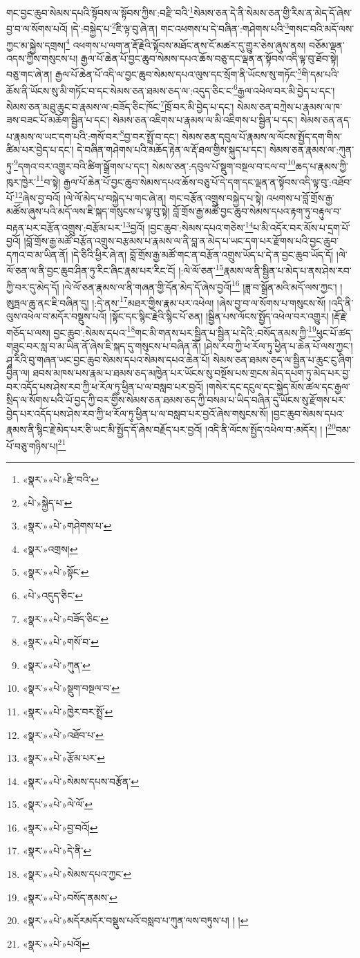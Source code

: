 གང་བྱང་ཆུབ་སེམས་དཔའི་སྟོབས་ལ་སྟོབས་ཀྱིས་:བརྫི་བའི་\footnote{«སྣར་»«པེ་»རྫི་བའི་}སེམས་ཅན་དེ་ནི་སེམས་ཅན་གྱི་རིས་ན་མེད་དོ་ཞེས་བྱ་བ་ལ་སོགས་པའོ། །དེ་:བསྐྱེད་པ་\footnote{«པེ་»སྐྱེད་པ་}ཇི་ལྟ་བུ་ཞེ་ན། གང་འཕགས་པ་དེ་བཞིན་:གཤེགས་པའི་\footnote{«སྣར་»«པེ་»གཤེགས་པ་}གསང་བའི་མདོ་ལས་ཀྱང་མ་སྐྱེས་དགྲས།\footnote{«སྣར་»འགྲས།} འཕགས་པ་ལག་ན་རྡོ་རྗེའི་སྟོབས་མཐོང་ནས་ངོ་མཚར་དུ་གྱུར་ཅེས་ཞུས་ནས། བཅོམ་ལྡན་འདས་ཀྱིས་གསུངས་པ། རྒྱལ་པོ་ཆེན་པོ་བྱང་ཆུབ་སེམས་དཔའ་ཆོས་བཅུ་དང་ལྡན་ན་སྟོབས་འདི་ལྟ་བུ་ཐོབ་སྟེ། བཅུ་གང་ཞེ་ན། རྒྱལ་པོ་ཆེན་པོ་འདི་ལ་བྱང་ཆུབ་སེམས་དཔའ་ལུས་དང་སྲོག་ནི་ཡོངས་སུ་གཏོང་\footnote{«སྣར་»«པེ་»སྟོང་}གི་དམ་པའི་ཆོས་ནི་ཡོངས་སུ་མི་གཏོང་བ་དང་སེམས་ཅན་ཐམས་ཅད་ལ་:འདུད་ཅིང་ང་\footnote{«པེ་»འདུད་ཅིང་}རྒྱལ་འཕེལ་བར་མི་བྱེད་པ་དང་། སེམས་ཅན་མཐུ་ཆུང་བ་རྣམས་ལ་:བཟོད་ཅིང་ཁོང་\footnote{«སྣར་»«པེ་»བཟོད་ཅིང་}ཁྲོ་བར་མི་བྱེད་པ་དང་། སེམས་ཅན་བཀྲེས་པ་རྣམས་ལ་ཁ་ཟས་བཟང་པོ་མཆོག་སྦྱིན་པ་དང་། སེམས་ཅན་འཇིགས་པ་རྣམས་ལ་མི་འཇིགས་པ་སྦྱིན་པ་དང་། སེམས་ཅན་ནད་པ་རྣམས་ལ་ཡང་དག་པའི་:གསོ་བར་\footnote{«སྣར་»«པེ་»གསོ་བ་}བྱ་བར་སྤྲོ་བ་དང་། སེམས་ཅན་དབུལ་པོ་རྣམས་ལ་ལོངས་སྤྱོད་དག་གིས་ཚིམ་པར་བྱེད་པ་དང་། དེ་བཞིན་གཤེགས་པའི་མཆོད་རྟེན་ལ་རྡོ་ཐལ་གྱིས་སྐུད་པ་དང་། སེམས་ཅན་རྣམས་ལ་:ཀུན་ཏུ་\footnote{«སྣར་»«པེ་»ཀུན་}དགའ་བར་འགྱུར་བའི་ཚིག་སྒྲོགས་པ་དང་། སེམས་ཅན་:དབུལ་པོ་སྡུག་བསྔལ་བ་ངལ་བ་\footnote{«སྣར་»«པེ་»སྡུག་བསྔལ་བ་}ཆད་པ་རྣམས་ཀྱི་ཁུར་ཁྱེར་\footnote{«སྣར་»«པེ་»ཁྱེར་བར་སྤྲོ་}བ་སྟེ། རྒྱལ་པོ་ཆེན་པོ་བྱང་ཆུབ་སེམས་དཔའ་ཆོས་བཅུ་པོ་དེ་དག་དང་ལྡན་ན་སྟོབས་འདི་ལྟ་བུ་:འཐོབ་པོ་\footnote{«སྣར་»«པེ་»འཐོབ་པ་}ཞེས་བྱ་བའོ། །ལེ་ལོ་མེད་པ་བསྐྱེད་པ་གང་ཞེ་ན། གང་བརྩོན་འགྲུས་བསྐྱེད་པ་སྟེ། འཕགས་པ་བློ་གྲོས་རྒྱ་མཚོས་ཞུས་པའི་མདོ་ལས་ཇི་སྐད་གསུངས་པ་ལྟ་བུ་སྟེ། བློ་གྲོས་རྒྱ་མཚོ་བྱང་ཆུབ་སེམས་དཔའ་རྟག་ཏུ་བརྟུལ་བ་བརྟན་པར་བརྩོན་འགྲུས་:བརྩོམ་པར་\footnote{«སྣར་»«པེ་»རྩོམ་པར་}བྱའོ། །བྱང་ཆུབ་:སེམས་དཔའ་གཅེས་\footnote{«སྣར་»«པེ་»སེམས་དཔས་བརྩོན་}པ་མི་འདོར་བར་མོས་པ་དྲག་པོ་བྱའོ། །བློ་གྲོས་རྒྱ་མཚོ་བརྩོན་འགྲུས་བརྩམས་པ་རྣམས་ལ་ནི་བླ་ན་མེད་པ་ཡང་དག་པར་རྫོགས་པའི་བྱང་ཆུབ་དཀའ་བ་མ་ཡིན་ནོ། །དེ་ཅིའི་ཕྱིར་ཞེ་ན། བློ་གྲོས་རྒྱ་མཚོ་གང་ན་བརྩོན་འགྲུས་ཡོད་པ་དེ་ན་བྱང་ཆུབ་ཡོད་དོ། །ལེ་ལོ་ཅན་ལ་ནི་བྱང་ཆུབ་ཤིན་ཏུ་རིང་ཞིང་རྣམ་པར་རིང་ངོ། །:ལེ་ལོ་ཅན་\footnote{«སྣར་»«པེ་»ལེ་ལོ་}རྣམས་ལ་ནི་སྦྱིན་པ་མེད་པ་ནས་ཤེས་རབ་ཀྱི་བར་དུ་མེད་དོ། །ལེ་ལོ་ཅན་རྣམས་ལ་ནི་གཞན་གྱི་དོན་མེད་དོ་ཞེས་བྱའོ།\footnote{«སྣར་»«པེ་»བྱ་བའོ།} །ཟླ་བ་སྒྲོན་མའི་མདོ་ལས་ཀྱང་། །ཨུཏྤལ་ཆུ་ནང་ཇི་བཞིན་དུ། །:དེ་ནས་\footnote{«སྣར་»«པེ་»དེ་ནི་}མཐར་གྱིས་རྣམ་པར་འཕེལ། །ཞེས་བྱ་བ་ལ་སོགས་པ་གསུངས་སོ། །འདི་ནི་ལུས་འཕེལ་བ་མདོར་བསྡུས་པའོ། །སྟོང་དང་སྙིང་རྗེའི་སྙིང་པོ་ཅན། །སྦྱིན་པས་ལོངས་སྤྱོད་འཕེལ་བར་འགྱུར། །རྡོ་རྗེ་གཅོད་པ་ལས། བྱང་ཆུབ་:སེམས་དཔའ་\footnote{«སྣར་»«པེ་»སེམས་དཔའ་ཀྱང་}གང་མི་གནས་པར་སྦྱིན་པ་སྦྱིན་པ་དེའི་:བསོད་ནམས་ཀྱི་\footnote{«སྣར་»«པེ་»བསོད་ནམས་}ཕུང་པོ་ཚད་གཟུང་བར་སླ་བ་མ་ཡིན་ནོ་ཞེས་ཇི་སྐད་དུ་གསུངས་པ་བཞིན་ནོ། །ཤེས་རབ་ཀྱི་ཕ་རོལ་ཏུ་ཕྱིན་པ་ཆེན་པོ་ལས་ཀྱང་། ཤཱ་རིའི་བུ་གཞན་ཡང་བྱང་ཆུབ་སེམས་དཔའ་སེམས་དཔའ་ཆེན་པོ། སེམས་ཅན་ཐམས་ཅད་ལ་སྦྱིན་པ་ཆུང་ངུ་ཞིག་བྱིན་ལ། ཐབས་མཁས་པས་རྣམ་པ་ཐམས་ཅད་མཁྱེན་པར་ཡོངས་སུ་བསྔོས་པས་གྲངས་མེད་དཔག་ཏུ་མེད་པར་བྱ་བར་འདོད་པས་ཤེས་རབ་ཀྱི་ཕ་རོལ་ཏུ་ཕྱིན་པ་ལ་བསླབ་པར་བྱའོ། །གསེར་དང་དངུལ་དང་སྐྱེད་མོས་ཚལ་དང་རྒྱལ་སྲིད་ལ་སོགས་པའི་ཡོ་བྱད་ཀྱི་བར་གྱིས་སེམས་ཅན་ཐམས་ཅད་ཀྱི་བསམ་པ་ཡིད་བཞིན་དུ་ཡོངས་སུ་རྫོགས་པར་བྱེད་པར་འདོད་པས་ཤེས་རབ་ཀྱི་ཕ་རོལ་ཏུ་ཕྱིན་པ་ལ་བསླབ་པར་བྱའོ་ཞེས་གསུངས་སོ། །བྱང་ཆུབ་སེམས་དཔའ་རྣམས་ནི་སྙིང་རྗེ་མེད་པར་ཅི་ཡང་མི་སྤྱོད་དོ་ཞེས་བརྗོད་པར་བྱའོ། །འདི་ནི་ལོངས་སྤྱོད་འཕེལ་བ་:མདོར། ། །\footnote{«སྣར་»«པེ་»མདོརམདོར་བསྡུས་པའོ་བསླབ་པ་ཀུན་ལས་བཏུས་པ། ། །}བམ་པོ་བཅུ་གཉིས་པ།\footnote{«སྣར་»«པེ་»པའོ།} 
